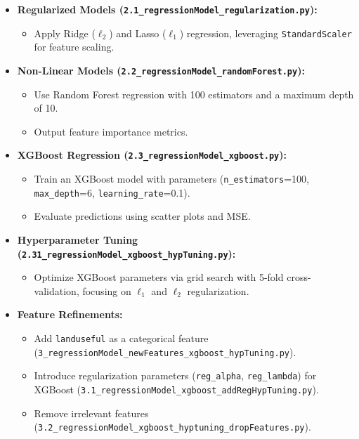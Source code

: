 \begin{itemize}
    \item \textbf{Regularized Models (\texttt{2.1\_regressionModel\_regularization.py}):}
    \begin{itemize}
        \item Apply Ridge (\(\ell_2\)) and Lasso (\(\ell_1\)) regression, leveraging \texttt{StandardScaler} for feature scaling.
    \end{itemize}

    \item \textbf{Non-Linear Models (\texttt{2.2\_regressionModel\_randomForest.py}):}
    \begin{itemize}
        \item Use Random Forest regression with 100 estimators and a maximum depth of 10.
        \item Output feature importance metrics.
    \end{itemize}

    \item \textbf{XGBoost Regression (\texttt{2.3\_regressionModel\_xgboost.py}):}
    \begin{itemize}
        \item Train an XGBoost model with parameters (\texttt{n\_estimators}=100, \texttt{max\_depth}=6, \texttt{learning\_rate}=0.1).
        \item Evaluate predictions using scatter plots and MSE.
    \end{itemize}

    \item \textbf{Hyperparameter Tuning (\texttt{2.31\_regressionModel\_xgboost\_hypTuning.py}):}
    \begin{itemize}
        \item Optimize XGBoost parameters via grid search with 5-fold cross-validation, focusing on \(\ell_1\) and \(\ell_2\) regularization.
    \end{itemize}

    \item \textbf{Feature Refinements:}
    \begin{itemize}
        \item Add \texttt{landuseful} as a categorical feature (\texttt{3\_regressionModel\_newFeatures\_xgboost\_hypTuning.py}).
        \item Introduce regularization parameters (\texttt{reg\_alpha}, \texttt{reg\_lambda}) for XGBoost (\texttt{3.1\_regressionModel\_xgboost\_addRegHypTuning.py}).
        \item Remove irrelevant features (\texttt{3.2\_regressionModel\_xgboost\_hyptuning\_dropFeatures.py}).
    \end{itemize}


\end{itemize}
